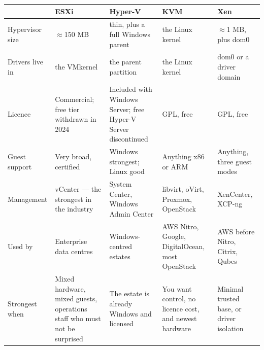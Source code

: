 \begin{longtable}{@{}L{2.5cm}L{3.0cm}L{3.0cm}L{3.0cm}L{3.0cm}@{}}
\toprule
{}
& \textbf{ESXi} & \textbf{Hyper-V} & \textbf{KVM} & \textbf{Xen} \\
\midrule
\endhead
Hypervisor size & $\approx$150 MB & thin, plus a full Windows parent &
the Linux kernel & $\approx$1 MB, plus dom0 \\
Drivers live in & the VMkernel & the parent partition & the Linux kernel &
dom0 or a driver domain \\
Licence & Commercial; free tier withdrawn in 2024 & Included with Windows
Server; free Hyper-V Server discontinued & GPL, free & GPL, free \\
Guest support & Very broad, certified & Windows strongest; Linux good &
Anything x86 or ARM & Anything, three guest modes \\
Management & vCenter --- the strongest in the industry & System Center, Windows
Admin Center & libvirt, oVirt, Proxmox, OpenStack & XenCenter, XCP-ng \\
Used by & Enterprise data centres & Windows-centred estates & AWS Nitro,
Google, DigitalOcean, most OpenStack & AWS before Nitro, Citrix, Qubes \\
Strongest when & Mixed hardware, mixed guests, operations staff who must not be
surprised & The estate is already Windows and licensed & You want control, no
licence cost, and newest hardware & Minimal trusted base, or driver
isolation \\
\bottomrule
\end{longtable}

